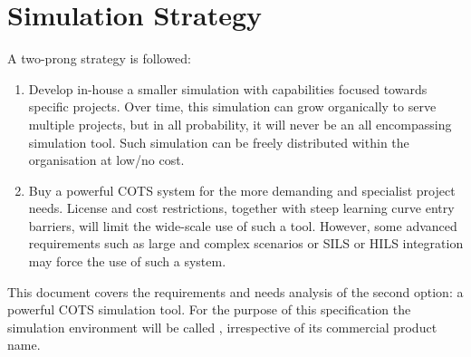\section{Simulation Strategy}

A two-prong strategy is followed:
\begin{enumerate}
    \item Develop in-house a smaller simulation with capabilities focused towards specific projects. Over time, this simulation can grow organically to serve multiple projects, but in all probability, it will never be an all encompassing simulation tool.  Such  simulation can be freely distributed within the organisation at low/no cost.
    \item Buy a powerful \ac{COTS} system for the more demanding and specialist project needs.  License and  cost restrictions, together with steep learning curve entry barriers,  will limit the wide-scale use of such a tool.  However, some advanced requirements such as large and complex scenarios or \ac{SILS} or \ac{HILS} integration may force the use of such a system.
\end{enumerate}

This document covers the requirements and needs analysis of the second option: a powerful \ac{COTS} simulation tool.
For the purpose of this specification the simulation environment will be called \scesys, irrespective of its commercial product name.


